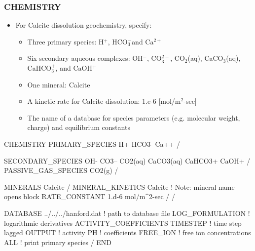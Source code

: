 \documentclass{beamer}
\def\calcium{Ca$^{2+}$}
\def\hion{H$^+$}
\def\hydroxide{OH$^-$}
\def\bicarbonate{HCO$_3^-$}
\def\carbonate{CO$_3^{2-}$}
\def\cotwo{CO$_2$(aq)}
\newcommand\bluecomment[1]{{{\color{blue} #1}}}
\begin{document}
\begin{frame}\frametitle{CHEMISTRY}

\begin{itemize}
\item For Calcite dissolution geochemistry, specify:
  \begin{itemize}
    \item Three primary species: \hion, \bicarbonate and \calcium
    \item Six secondary aqueous complexes: \hydroxide, \carbonate, \cotwo, CaCO$_3$(aq), CaHCO$_3^+$, and CaOH$^+$
    \item One mineral: Calcite
    \item A kinetic rate for Calcite dissolution: 1.e-6 [mol/m$^2$-sec]
    \item The name of a database for species parameters (e.g. molecular weight, charge) and equilibrium constants
  \end{itemize}
\end{itemize}

\begin{semiverbatim}
CHEMISTRY
  PRIMARY_SPECIES
    H+
    HCO3-
    Ca++
  /
\end{semiverbatim}
\newpage

\begin{semiverbatim}


  SECONDARY_SPECIES
    OH-
    CO3--
    CO2(aq)
    CaCO3(aq)
    CaHCO3+
    CaOH+
  /
  PASSIVE_GAS_SPECIES
    CO2(g)
  /
\end{semiverbatim}
\newpage

\begin{semiverbatim}


  MINERALS
    Calcite
  /
  MINERAL_KINETICS
    Calcite       \bluecomment{! Note: mineral name opens block}
      RATE_CONSTANT 1.d-6 mol/m^2-sec
    /
  /
\end{semiverbatim}
\newpage

\begin{semiverbatim}


  DATABASE ../../../hanford.dat  \bluecomment{! path to database file}
  LOG_FORMULATION         \bluecomment{! logarithmic derivatives}
  ACTIVITY_COEFFICIENTS TIMESTEP  \bluecomment{! time step lagged}
  OUTPUT                          \bluecomment{!   activity}
    PH                            \bluecomment{!   coefficients}
    FREE_ION  \bluecomment{! free ion concentrations}
    ALL       \bluecomment{! print primary species}
  /
END

\end{semiverbatim}

\end{frame}
\end{document}
